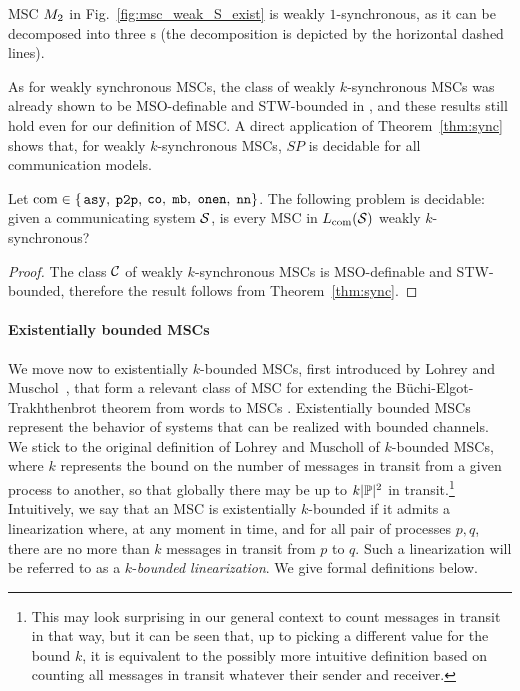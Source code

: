 \begin{example}
MSC $M_{2}$ in Fig.~\ref{fig:msc_weak_S_exist} is weakly $1$-synchronous, as it can be
decomposed  into three s (the decomposition is depicted by the
horizontal dashed lines).
\end{example}

As for weakly synchronous MSCs, the class of weakly $k$-synchronous MSCs was already shown to be MSO-definable and STW-bounded in \cite{BolligGFLLS21}, and these results still hold even for our definition of MSC. A direct application of Theorem~\ref{thm:sync} shows that, for weakly $k$-synchronous MSCs, $SP$ is decidable for all communication models.

\begin{proposition}\label{thm:weak-k-sync}
	Let $\textup{com} \in \{$$\mathtt{asy}, $ $\mathtt{p2p}, $ $\mathtt{co}, $ $\mathtt{mb}, $ $\mathtt{onen}, $ $\mathtt{nn}\}$.
	The following problem is decidable:
	given a communicating system $\mathcal{S}$,
	is every MSC in $L_{\textup{com}}(\mathcal{S})$ weakly $k$-synchronous?
\end{proposition}
\begin{proof}
	The class $\mathcal{C}$ of weakly $k$-synchronous MSCs is MSO-definable and STW-bounded, therefore the
	result follows from Theorem~\ref{thm:sync}.
\end{proof}

\paragraph{\bf Existentially bounded MSCs}

We move now to existentially $k$-bounded MSCs, first introduced by Lohrey and Muschol~\cite{DBLP:conf/fossacs/LohreyM02}, that form a relevant class of MSC for extending the
B\"uchi-Elgot-Trakhthenbrot theorem from words to MSCs \cite{genest2004kleene,GKM07}. 
Existentially bounded MSCs represent the behavior of systems that can be realized with bounded channels. 
We stick to the original definition of Lohrey and Muscholl of $k$-bounded MSCs, where $k$
represents the bound on the number of messages in transit from a given process to another, so that globally
there may be up to $k| \mathbb{P} |^2$ in transit.\footnote{This may look
surprising in our general context to count messages in transit in that way, but it can be seen that, up to picking
a different value for the bound $k$, it is equivalent to the possibly more
intuitive definition based on counting all messages in transit whatever their sender and receiver.}
Intuitively, we say that an MSC is existentially $k$-bounded if it admits a linearization where, at any moment in time, and for all pair of processes $p,q$, there are no more than $k$ messages in transit from $p$ to $q$. Such a linearization will be referred to as a $k$-\emph{bounded linearization}. We give formal definitions below.

